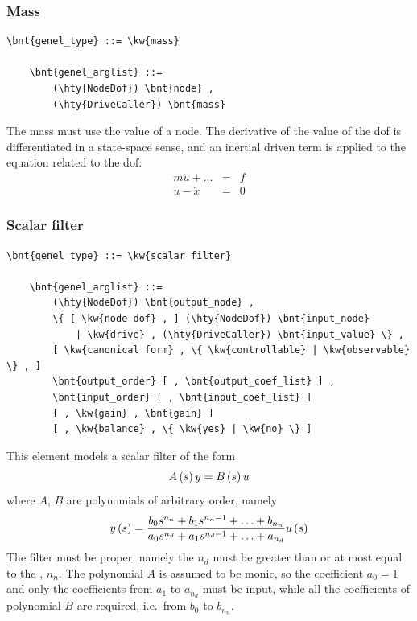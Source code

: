 \subsubsection{Mass}
\label{sec:EL:GENEL:MASS}
\begin{Verbatim}[commandchars=\\\{\}]
    \bnt{genel_type} ::= \kw{mass}

    \bnt{genel_arglist} ::=
        (\hty{NodeDof}) \bnt{node} ,
        (\hty{DriveCaller}) \bnt{mass}
\end{Verbatim}
The mass must use the  value of a  node.
The derivative of the  value of
the dof is differentiated in a state-space sense, and an inertial driven
term is applied to the equation related to the dof:
\begin{eqnarray*}
        m\dot{u} + \ldots & = & f \\
	u - \dot{x} & = & 0
\end{eqnarray*}

\subsubsection{Scalar filter}
\label{sec:EL:GENEL:SCALAR-FILTER}
\begin{Verbatim}[commandchars=\\\{\}]
    \bnt{genel_type} ::= \kw{scalar filter}

    \bnt{genel_arglist} ::=
        (\hty{NodeDof}) \bnt{output_node} ,
        \{ [ \kw{node dof} , ] (\hty{NodeDof}) \bnt{input_node}
            | \kw{drive} , (\hty{DriveCaller}) \bnt{input_value} \} ,
        [ \kw{canonical form} , \{ \kw{controllable} | \kw{observable} \} , ]
        \bnt{output_order} [ , \bnt{output_coef_list} ] ,
        \bnt{input_order} [ , \bnt{input_coef_list} ]
        [ , \kw{gain} , \bnt{gain} ]
        [ , \kw{balance} , \{ \kw{yes} | \kw{no} \} ]
\end{Verbatim}
This element models a scalar filter of the form
\begin{displaymath}
    A\left( s \right)y = B\left( s \right)u
\end{displaymath}
where $ A $, $ B $ are polynomials of arbitrary order, namely
\begin{displaymath}
	y\left( s \right) = \frac{
		b_0 s^{n_n}
		+ b_1 s^{n_n-1}
		+ \ldots
		+ b_{n_n}
	}{
		a_0 s^{n_d}
		+ a_1 s^{n_d-1}
		+ \ldots
		+ a_{n_d}
	} u\left( s \right)
\end{displaymath}
The filter must be proper, namely the  $n_d$
must be greater than or at most equal to the , $n_n$.
The polynomial $ A $ is assumed to be monic, so the coefficient 
$a_0=1$ and only the coefficients from $a_1$ to $a_{n_d}$ must be input,
while all the coefficients of polynomial $ B $ are required,
i.e.\ from $b_0$ to $b_{n_n}$.

